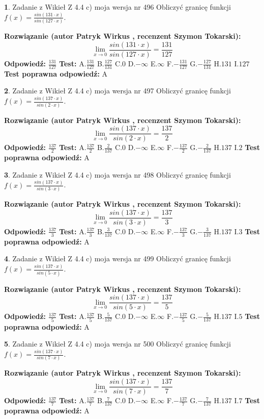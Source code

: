 \documentclass[12pt, a4paper]{article}
\theoremstyle{definition} %
\newtheorem{zad}{}
\newcommand{\zadStart}[1]{\begin{zad}#1\newline}
\newcommand{\zadStop}{\end{zad}}
\newcommand{\rozwStart}[2]{\noindent \textbf{Rozwiązanie (autor #1 , recenzent #2): }\newline}
\newcommand{\rozwStop}{\newline}
\newcommand{\odpStart}{\noindent \textbf{Odpowiedź:}\newline}
\newcommand{\odpStop}{\newline}
\newcommand{\testStart}{\noindent \textbf{Test:}\newline}
\newcommand{\testStop}{\newline}
\newcommand{\kluczStart}{\noindent \textbf{Test poprawna odpowiedź:}\newline}
\newcommand{\kluczStop}{\newline}
\begin{document}
\zadStart{Zadanie z Wikieł Z 4.4 c) moja wersja nr 496}
Obliczyć granicę funkcji $f(x)=\frac{sin(131\cdot x)}{sin(127\cdot x)}$.
\zadStop
\rozwStart{Patryk Wirkus}{Szymon Tokarski}
$$\lim\limits_{x\to 0}\frac{sin(131\cdot x)}{sin(127\cdot x)}=
\frac{131}{127}$$
\rozwStop
\odpStart
$\frac{131}{127}$
\odpStop
\testStart
A.$\frac{131}{127}$
B.$\frac{127}{131}$
C.$0$
D.$-\infty$
E.$\infty$
F.$-\frac{131}{127}$
G.$-\frac{127}{131}$
H.$131$
I.$127$
\testStop
\kluczStart
A
\kluczStop



\zadStart{Zadanie z Wikieł Z 4.4 c) moja wersja nr 497}
Obliczyć granicę funkcji $f(x)=\frac{sin(137\cdot x)}{sin(2\cdot x)}$.
\zadStop
\rozwStart{Patryk Wirkus}{Szymon Tokarski}
$$\lim\limits_{x\to 0}\frac{sin(137\cdot x)}{sin(2\cdot x)}=
\frac{137}{2}$$
\rozwStop
\odpStart
$\frac{137}{2}$
\odpStop
\testStart
A.$\frac{137}{2}$
B.$\frac{2}{137}$
C.$0$
D.$-\infty$
E.$\infty$
F.$-\frac{137}{2}$
G.$-\frac{2}{137}$
H.$137$
I.$2$
\testStop
\kluczStart
A
\kluczStop



\zadStart{Zadanie z Wikieł Z 4.4 c) moja wersja nr 498}
Obliczyć granicę funkcji $f(x)=\frac{sin(137\cdot x)}{sin(3\cdot x)}$.
\zadStop
\rozwStart{Patryk Wirkus}{Szymon Tokarski}
$$\lim\limits_{x\to 0}\frac{sin(137\cdot x)}{sin(3\cdot x)}=
\frac{137}{3}$$
\rozwStop
\odpStart
$\frac{137}{3}$
\odpStop
\testStart
A.$\frac{137}{3}$
B.$\frac{3}{137}$
C.$0$
D.$-\infty$
E.$\infty$
F.$-\frac{137}{3}$
G.$-\frac{3}{137}$
H.$137$
I.$3$
\testStop
\kluczStart
A
\kluczStop



\zadStart{Zadanie z Wikieł Z 4.4 c) moja wersja nr 499}
Obliczyć granicę funkcji $f(x)=\frac{sin(137\cdot x)}{sin(5\cdot x)}$.
\zadStop
\rozwStart{Patryk Wirkus}{Szymon Tokarski}
$$\lim\limits_{x\to 0}\frac{sin(137\cdot x)}{sin(5\cdot x)}=
\frac{137}{5}$$
\rozwStop
\odpStart
$\frac{137}{5}$
\odpStop
\testStart
A.$\frac{137}{5}$
B.$\frac{5}{137}$
C.$0$
D.$-\infty$
E.$\infty$
F.$-\frac{137}{5}$
G.$-\frac{5}{137}$
H.$137$
I.$5$
\testStop
\kluczStart
A
\kluczStop



\zadStart{Zadanie z Wikieł Z 4.4 c) moja wersja nr 500}
Obliczyć granicę funkcji $f(x)=\frac{sin(137\cdot x)}{sin(7\cdot x)}$.
\zadStop
\rozwStart{Patryk Wirkus}{Szymon Tokarski}
$$\lim\limits_{x\to 0}\frac{sin(137\cdot x)}{sin(7\cdot x)}=
\frac{137}{7}$$
\rozwStop
\odpStart
$\frac{137}{7}$
\odpStop
\testStart
A.$\frac{137}{7}$
B.$\frac{7}{137}$
C.$0$
D.$-\infty$
E.$\infty$
F.$-\frac{137}{7}$
G.$-\frac{7}{137}$
H.$137$
I.$7$
\testStop
\kluczStart
A
\kluczStop
\end{document}
